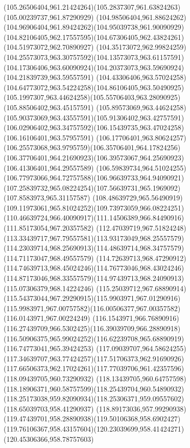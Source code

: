 {{	\curveto(105.26506404,961.21424264)(105.2837307,961.63824263)(105.00239737,961.87290929)
	\curveto(104.98506404,961.88624262)(104.96906404,961.89424262)(104.95039738,961.90090929)
	\curveto(104.82106405,962.17557595)(104.67306405,962.43824261)(104.51973072,962.70890927)
	\curveto(104.35173072,962.99824259)(104.25573073,963.30757592)(104.13573073,963.61157591)
	\curveto(104.17306406,963.60090924)(104.20373073,963.59690924)(104.21839739,963.59557591)
	\curveto(104.43306406,963.57024258)(104.64773072,963.54224258)(104.86106405,963.50490925)
	\curveto(105.1997307,963.44624258)(105.55706403,963.28090925)(105.88506402,963.45157591)
	\curveto(105.89573069,963.44624258)(105.90373069,963.43557591)(105.91306402,963.42757591)
	\curveto(106.02906402,963.34757592)(106.15439735,963.47024258)(106.16106401,963.57957591)
	\curveto(106.17706401,963.80624257)(106.25573068,963.9795759)(106.35706401,964.17824256)
	\curveto(106.37706401,964.21690923)(106.39573067,964.25690923)(106.41306401,964.29557589)
	\curveto(106.59839734,964.51024255)(106.77973066,964.72757588)(106.96639733,964.94090921)
	\curveto(107.25839732,965.08224254)(107.56639731,965.1969092)(107.8583973,965.31157587)
	\curveto(108.48639729,965.56490919)(109.11973061,965.81024252)(109.73973059,966.08224251)
	\curveto(110.46639724,966.40090917)(111.14506389,966.84490916)(111.85173054,967.20357582)
	\curveto(112.47039719,967.51824248)(113.33439717,967.79557581)(113.93173049,968.25557579)
	\curveto(114.23039714,968.25690913)(114.48639714,968.34757579)(114.71173047,968.49557579)
	\curveto(114.72639713,968.47290912)(114.74639713,968.45024246)(114.76773046,968.43024246)
	\curveto(114.87173046,968.33557579)(114.97439713,968.24090913)(115.07306379,968.14224246)
	\curveto(115.25039712,967.68890914)(115.54373044,967.29290915)(115.9903971,967.01290916)
	\curveto(115.9983971,967.00757582)(116.00506377,967.00357582)(116.0143971,967.00224249)
	\curveto(116.1543971,966.76890916)(116.27439709,966.5302425)(116.39039709,966.28890918)
	\curveto(116.50906375,965.99024252)(116.62239708,965.68890919)(116.74773041,965.39424253)
	\curveto(117.09039707,964.58624255)(117.34639707,963.77424257)(117.51706373,962.91690926)
	\curveto(117.66506373,962.17024261)(117.77039706,961.42357596)(118.09439705,960.73290932)
	\curveto(118.13439705,960.64757598)(118.18906371,960.58757599)(118.25439704,960.54890932)
	\curveto(118.25173038,959.82090934)(118.25306371,959.09557602)(118.65039703,958.41290937)
	\curveto(118.89173036,957.99290938)(119.47439701,958.28890938)(119.50106368,958.6902427)
	\curveto(119.76106367,958.43157604)(120.23039699,958.41424271)(120.45306366,958.78757603)
}}
